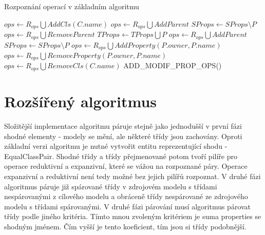 \documentclass[11pt,twoside,a4paper]{book}
\begin{document}
\begin{algorithm}
 \caption{Rozpoznání operací v základním
 algoritmu}\label{algo:matching:ops_recognition}

\begin{algorithmic}[1]
   \Statex
   \State $ops \gets R_{ops} \bigcup AddCls(C.name)$
   \EndFor
   \Statex
    
         \State $ops \gets R_{ops} \bigcup AddParent$
            \State $SProps \gets SProps \setminus P$
         \EndFor
      \EndIf
   \EndFor
   \Statex
    
         \State $ops \gets R_{ops} \bigcup RemoveParent$
            \State $TProps \gets TProps \bigcup P$
         \EndFor
      \EndIf
   \EndFor
   \Statex
    
            \State $ops \gets R_{ops} \bigcup AddParent$
               \State $SProps \gets SProps \setminus P$
            \EndFor
         \EndIf
      \EndFor
   \EndFor
   \Statex
   \State $ops \gets R_{ops} \bigcup AddProperty(P.owner, P.name)$
   \EndFor
   \Statex
   \State $ops \gets R_{ops} \bigcup RemoveProperty(P.owner, P.name)$
   \EndFor
   \Statex
   \State $ops \gets R_{ops} \bigcup RemoveCls(C.name)$
   \EndFor   
   \Statex
   \State ADD\_MODIF\_PROP\_OPS()
   \EndProcedure
\end{algorithmic}
\end{algorithm}

\FloatBarrier
 
 \section{Rozšířený algoritmus}
 Složitější implementace algoritmu páruje stejně jako jednodušší v
 první fázi shodné elementy - modely se mění, ale některé třídy jsou zachovány.
 Oproti základní verzi algoritmu je nutné vytvořit entitu reprezentující shodu -
 EqualClassPair. Shodné třídy a třídy přejmenované potom tvoří pilíře pro
 operace reduktivní a expanzivní, které se vážou na rozpoznané páry. Operace
 expanzivní a reduktivní není tedy možné bez jejich pilířů rozpoznat. V
 druhé fázi algoritmus páruje již spárované třídy v zdrojovém modelu s třídami
 nespárovanými z cílového modelu a obráceně třídy nespárované ze zdrojového
 modelu s třídami spárovanými. V druhé fázi párování musí algoritmus párovat
 třídy podle jiného kritéria.
 Tímto mnou zvoleným kritériem je suma properties se shodným jménem. Čím vyšší
 je tento koeficient, tím jsou si třídy podobnější.\\
 
\end{document}
